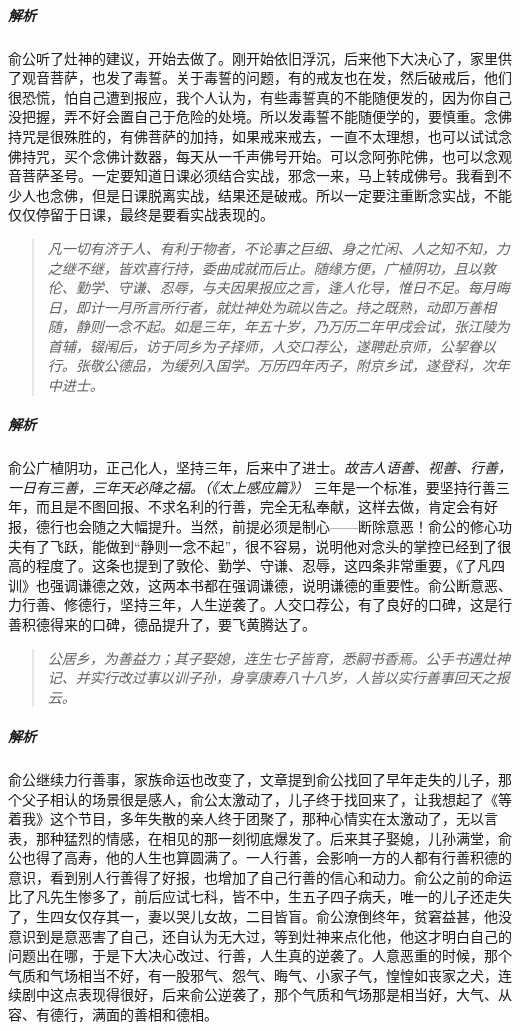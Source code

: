 \subparagraph{解析} 俞公听了灶神的建议，开始去做了。刚开始依旧浮沉，后来他下大决心了，家里供了观音菩萨，也发了毒誓。关于毒誓的问题，有的戒友也在发，然后破戒后，他们很恐慌，怕自己遭到报应，我个人认为，有些毒誓真的不能随便发的，因为你自己没把握，弄不好会置自己于危险的处境。所以发毒誓不能随便学的，要慎重。念佛持咒是很殊胜的，有佛菩萨的加持，如果戒来戒去，一直不太理想，也可以试试念佛持咒，买个念佛计数器，每天从一千声佛号开始。可以念阿弥陀佛，也可以念观音菩萨圣号。一定要知道日课必须结合实战，邪念一来，马上转成佛号。我看到不少人也念佛，但是日课脱离实战，结果还是破戒。所以一定要注重断念实战，不能仅仅停留于日课，最终是要看实战表现的。

\begin{quote}\it
    凡一切有济于人、有利于物者，不论事之巨细、身之忙闲、人之知不知，力之继不继，皆欢喜行持，委曲成就而后止。随缘方便，广植阴功，且以敦伦、勤学、守谦、忍辱，与夫因果报应之言，逢人化导，惟日不足。每月晦日，即计一月所言所行者，就灶神处为疏以告之。持之既熟，动即万善相随，静则一念不起。如是三年，年五十岁，乃万历二年甲戌会试，张江陵为首辅，辍闱后，访于同乡为子择师，人交口荐公，遂聘赴京师，公挈眷以行。张敬公德品，为缓列入国学。万历四年丙子，附京乡试，遂登科，次年中进士。
\end{quote}

\subparagraph{解析} 俞公广植阴功，正己化人，坚持三年，后来中了进士。\textit{故吉人语善、视善、行善，一日有三善，三年天必降之福。（《太上感应篇》）} 三年是一个标准，要坚持行善三年，而且是不图回报、不求名利的行善，完全无私奉献，这样去做，肯定会有好报，德行也会随之大幅提升。当然，前提必须是制心——断除意恶！俞公的修心功夫有了飞跃，能做到“静则一念不起”，很不容易，说明他对念头的掌控已经到了很高的程度了。这条也提到了敦伦、勤学、守谦、忍辱，这四条非常重要，《了凡四训》也强调谦德之效，这两本书都在强调谦德，说明谦德的重要性。俞公断意恶、力行善、修德行，坚持三年，人生逆袭了。人交口荐公，有了良好的口碑，这是行善积德得来的口碑，德品提升了，要飞黄腾达了。

\begin{quote}\it
    公居乡，为善益力；其子娶媳，连生七子皆育，悉嗣书香焉。公手书遇灶神记、并实行改过事以训子孙，身享康寿八十八岁，人皆以实行善事回天之报云。
\end{quote}

\subparagraph{解析} 俞公继续力行善事，家族命运也改变了，文章提到俞公找回了早年走失的儿子，那个父子相认的场景很是感人，俞公太激动了，儿子终于找回来了，让我想起了《等着我》这个节目，多年失散的亲人终于团聚了，那种心情实在太激动了，无以言表，那种猛烈的情感，在相见的那一刻彻底爆发了。后来其子娶媳，儿孙满堂，俞公也得了高寿，他的人生也算圆满了。一人行善，会影响一方的人都有行善积德的意识，看到别人行善得了好报，也增加了自己行善的信心和动力。俞公之前的命运比了凡先生惨多了，前后应试七科，皆不中，生五子四子病夭，唯一的儿子还走失了，生四女仅存其一，妻以哭儿女故，二目皆盲。俞公潦倒终年，贫窘益甚，他没意识到是意恶害了自己，还自认为无大过，等到灶神来点化他，他这才明白自己的问题出在哪，于是下大决心改过、行善，人生真的逆袭了。人意恶重的时候，那个气质和气场相当不好，有一股邪气、怨气、晦气、小家子气，惶惶如丧家之犬，连续剧中这点表现得很好，后来俞公逆袭了，那个气质和气场那是相当好，大气、从容、有德行，满面的善相和德相。

